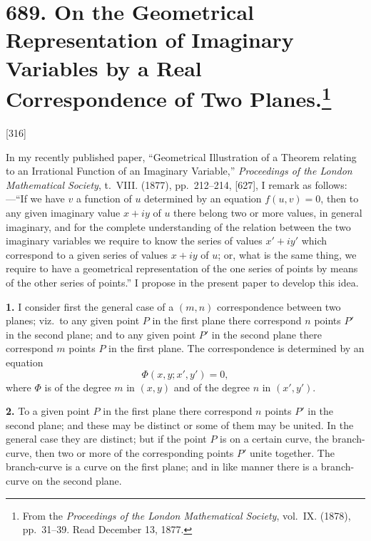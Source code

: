 \documentclass[12pt,a4paper]{article}
\theoremstyle{definition}
\begin{document}
\newpage
\section[On the Geometrical Representation of Imaginary Variables by a Real Correspondence of Two Planes]{689. On the Geometrical Representation of Imaginary Variables by a Real Correspondence of Two Planes.\footnote{From the \textit{Proceedings of the London Mathematical Society}, vol.\ IX. (1878), pp.\ 31--39. Read December 13, 1877.}}

[316]

In my recently published paper, ``Geometrical Illustration of a Theorem relating to an Irrational Function of an Imaginary Variable,'' \textit{Proceedings of the London Mathematical Society}, t.\ VIII. (1877), pp.\ 212--214, [627], I remark as follows:---``If we have $v$ a function of $u$ determined by an equation $f(u, v) = 0$, then to any given imaginary value $x + iy$ of $u$ there belong two or more values, in general imaginary, and for the complete understanding of the relation between the two imaginary variables we require to know the series of values $x' + iy'$ which correspond to a given series of values $x + iy$ of $u$; or, what is the same thing, we require to have a geometrical representation of the one series of points by means of the other series of points.'' I propose in the present paper to develop this idea.

\medskip
\noindent\textbf{1.}\quad
I consider first the general case of a $(m, n)$ correspondence between two planes; viz.\ to any given point $P$ in the first plane there correspond $n$ points $P'$ in the second plane; and to any given point $P'$ in the second plane there correspond $m$ points $P$ in the first plane. The correspondence is determined by an equation
\[
\Phi(x, y; x', y') = 0,
\]
where $\Phi$ is of the degree $m$ in $(x, y)$ and of the degree $n$ in $(x', y')$.

\medskip
\noindent\textbf{2.}\quad
To a given point $P$ in the first plane there correspond $n$ points $P'$ in the second plane; and these may be distinct or some of them may be united. In the general case they are distinct; but if the point $P$ is on a certain curve, the branch-curve, then two or more of the corresponding points $P'$ unite together. The branch-curve is a curve on the first plane; and in like manner there is a branch-curve on the second plane.
\end{document}
